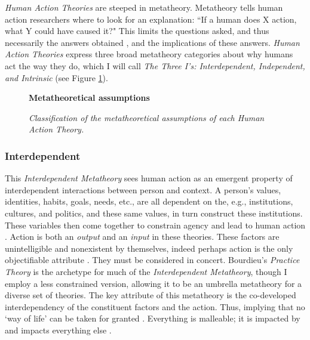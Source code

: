 \documentclass[12 pt]{article}
\begin{document}
	\textit{Human Action Theories} are steeped in metatheory. Metatheory tells human action researchers where to look for an explanation: ``If a human does X action, what Y could have caused it?" This limits the questions asked, and thus necessarily the answers obtained \parencite{Abrams2015}, and the implications of these answers. \textit{Human Action Theories} express three broad metatheory categories about why humans act the way they do, which I will call \textit{The Three I's: Interdependent, Independent, and Intrinsic} (see Figure \ref{fig:meta}). 
\begin{figure}
	\centering
	\textbf{Metatheoretical assumptions} \par \medskip
	\caption{\textit{Classification of the metatheoretical assumptions of each Human Action Theory.}}
	 \label{fig:meta}
\end{figure}	  
	\subsubsection{Interdependent} 
		This \textit{Interdependent Metatheory} sees human action as an emergent property of interdependent interactions between person and context.  A person's values, identities, habits, goals, needs, etc., are all dependent on the, e.g., institutions, cultures, and politics, and these same values, in turn construct these institutions. These variables then come together to constrain agency \parencite{Vigotsky1978} and lead to human action \parencite{Holland1998}. Action is both an \textit{output} and an \textit{input} in these theories.  These factors are unintelligible and nonexistent by themselves, indeed perhaps action is the only objectifiable attribute \parencite{Lewin1939,Bourdieu1977,Heft2012}. They must be considered in concert. Bourdieu's \textit{Practice Theory} is the archetype for much of the \textit{Interdependent Metatheory}, though I employ a less constrained version, allowing it to be an umbrella metatheory for a diverse set of theories. The key attribute of this metatheory is the co-developed interdependency of the constituent factors and the action. Thus, implying that no `way of life' can be taken for granted \parencite{Redclift1996}. Everything is malleable; it is impacted by and impacts everything else \parencite{Shove2010}.
		
\end{document}
